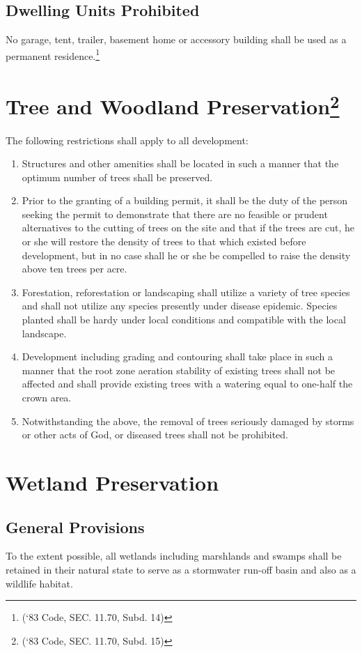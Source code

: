 \subsection{Dwelling Units Prohibited}
No garage, tent, trailer, basement home or accessory building shall be used as a permanent residence.\footnote{(‘83 Code, SEC. 11.70, Subd. 14)}

\section{Tree and Woodland Preservation\footnote{(‘83 Code, SEC. 11.70, Subd. 15)}}
The following restrictions shall apply to all development:
\begin{enumerate}[{\indent}A)]
    \item Structures and other amenities shall be located in such a manner that the optimum number of trees shall be preserved.
    \item Prior to the granting of a building permit, it shall be the duty of the person seeking the permit to demonstrate that there are no feasible or prudent alternatives to the cutting of trees on the site and that if the trees are cut, he or she will restore the density of trees to that which existed before development, but in no case shall he or she be compelled to raise the density above ten trees per acre.
    \item Forestation, reforestation or landscaping shall utilize a variety of tree species and shall not utilize any species presently under disease epidemic. Species planted shall be hardy under local conditions and compatible with the local landscape.
    \item Development including grading and contouring shall take place in such a manner that the root zone aeration stability of existing trees shall not be affected and shall provide existing trees with a watering equal to one-half the crown area.
    \item Notwithstanding the above, the removal of trees seriously damaged by storms or other acts of God, or diseased trees shall not be prohibited.
\end{enumerate}

\section{Wetland Preservation}
\subsection{General Provisions}
To the extent possible, all wetlands including marshlands and swamps shall be retained in their natural state to serve as a stormwater run-off basin and also as a wildlife habitat.
